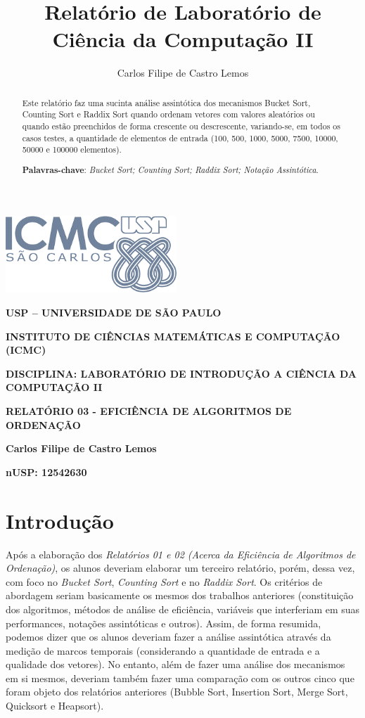 \documentclass[a4paper, 12pt]{article}
\title{Relatório de Laboratório de Ciência da Computação II}
\author{Carlos Filipe de Castro Lemos}
\begin{document}

\begin{center}
    \includegraphics[width=2.52778in,height=1.14532in]{logotipoICMC.png}

        \textbf{USP -- UNIVERSIDADE DE SÃO PAULO}

        \textbf{INSTITUTO DE CIÊNCIAS MATEMÁTICAS E COMPUTAÇÃO (ICMC)}

        \textbf{DISCIPLINA: LABORATÓRIO DE INTRODUÇÃO A CIÊNCIA DA COMPUTAÇÃO II}

    \vspace{0.9cm}

        \textbf{RELATÓRIO 03 - EFICIÊNCIA DE ALGORITMOS DE ORDENAÇÃO}

        \textbf{Carlos Filipe de Castro Lemos}

        \textbf{nUSP: 12542630}
    \end{center}

\vspace{0.2cm}
\begin{abstract}
   \noindent
   Este relatório faz uma sucinta análise assintótica dos mecanismos Bucket Sort, Counting Sort e Raddix Sort quando ordenam vetores com valores aleatórios ou quando estão preenchidos de forma crescente ou descrescente, variando-se, em todos os casos testes, a quantidade de elementos de entrada (100, 500, 1000, 5000, 7500, 10000, 50000 e 100000 elementos).

   \noindent
   \textbf{Palavras-chave}: \textit{Bucket Sort; Counting Sort; Raddix Sort; Notação Assintótica}.
\end{abstract}


\section{Introdução}

\tab{ }Após a elaboração dos \textit{Relatórios 01 e 02 (Acerca da Eficiência de Algoritmos de Ordenação)}, os alunos deveriam elaborar um terceiro relatório, porém, dessa vez, com foco no \textit{Bucket Sort}, \textit{Counting Sort} e no \textit{Raddix Sort}. Os critérios de abordagem seriam basicamente os mesmos dos trabalhos anteriores (constituição dos algoritmos, métodos de análise de eficiência, variáveis que interferiam em suas performances, notações assintóticas e outros). Assim, de forma resumida, podemos dizer que os alunos deveriam fazer a análise assintótica através da medição de marcos temporais (considerando a quantidade de entrada e a qualidade dos vetores). No entanto, além de fazer uma análise dos mecanismos em si mesmos, deveriam também fazer uma comparação com os outros cinco que foram objeto dos relatórios anteriores (Bubble Sort, Insertion Sort, Merge Sort, Quicksort e Heapsort).
\end{document}
